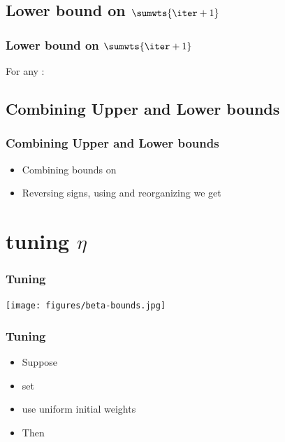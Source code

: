 \documentclass{beamer}
\begin{document}
\subsection{Lower bound on $\sumwts{\iter+1}$}

\begin{frame}
\frametitle{Lower bound on $\sumwts{\iter+1}$}

For any :
\R{\[
\sumwts{\iter+1} \geq \wt{\iter+1}{j} = \wt{1}{j} e^{-\eta \lossi{j}}
\]}

\end{frame}

\subsection{Combining Upper and Lower bounds}

\begin{frame}
\frametitle{Combining Upper and Lower bounds}
\begin{itemize}
\item
Combining bounds on 
\R{\[
 \ln \wt{1}{j} -\eta \lossi{j} \leq \ln \sumwts{\iter+1} 
 \leq -(1-e^{-\eta}) \sum_{t=1}^T \distvec{t}\cdot\costvec{t}
\]}
\item
Reversing signs, using  
and reorganizing we get
\end{itemize}
\end{frame}

\section{tuning $\eta$}

\begin{frame}
\frametitle{Tuning \R{$\eta$}}
\texttt{[image: figures/beta-bounds.jpg]}
\end{frame}

\begin{frame}
\frametitle{Tuning \R{$\eta$}}
\begin{itemize}
\item Suppose 
\item set
\R{\[
\eta = \ln \paren{ 1+ \sqrt{\frac{2 \ln N}{\upbnd{L}}}} \approx \sqrt{\frac{2 \ln N}{\upbnd{L}}}
\]}
\item use uniform initial weights 
\item Then
\end{itemize}
\end{frame}
\end{document}
